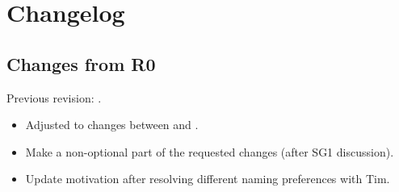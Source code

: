 \section{Changelog}
\subsection{Changes from R0}
Previous revision: \parencite{P0964R0}.
\begin{itemize}
    \item Adjusted to changes between \cite{P0214R8} and \cite{N4744}.
    \item Make  a non-optional part of the requested changes (after SG1 discussion).
    \item Update motivation after resolving different naming preferences with Tim.
\end{itemize}
